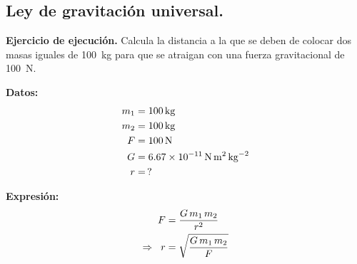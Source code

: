 \documentclass[12pt, letter]{exam}
\begin{document}
\begin{questions}
    \section{Ley de gravitación universal.}

    \setcounter{question}{17} \question \textbf{Ejercicio de ejecución.} Calcula la distancia a la que se deben de colocar dos masas iguales de \SI{100}{\kilo\gram} para que se atraigan con una fuerza gravitacional de \SI{100}{\newton}.

    \vspace*{0.3cm}
    \begin{minipage}[t]{0.4\linewidth}
    \textbf{Datos:}
    \begin{align*}
    m_{1} &= \SI{100}{\kilo\gram} \\
    m_{2} &= \SI{100}{\kilo\gram} \\
    F &= \SI{100}{\newton} \\
    G &= \SI{6.67d-11}{\newton\square\meter\per\square\kilo\gram} \\
    r &= \, ?
    \end{align*}
    \end{minipage}
    \hspace{1cm}
    \begin{minipage}[t]{0.4\linewidth}
    \textbf{Expresión:}
    \begin{align*}
    F &= \dfrac{G \, m_{1} \, m_{2}}{r^{2}} \\
    \Rightarrow \hspace{0.2cm} r &= \sqrt{\dfrac{G \, m_{1} \, m_{2}}{F}}
    \end{align*}
    \end{minipage}


\end{questions}
\end{document}

